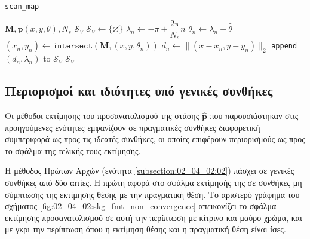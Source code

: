 \begin{algorithm}[!h]
  \caption{\texttt{scan\_map}}
  \label{alg:scan_map}
  \begin{spacing}{1.3}
    \begin{algorithmic}[1]
      \REQUIRE $\bm{M}, \bm{p}(x, y, \theta), N_s$
      \ENSURE $\mathcal{S}_V$
      \STATE $\mathcal{S}_V \leftarrow \{\varnothing\}$
      \STATE $\lambda_n \leftarrow -\pi + \dfrac{2\pi}{N_s} n$
      \STATE $\theta_n \leftarrow \lambda_n + \hat{\theta}$
      \STATE $(x_n,y_n) \leftarrow \texttt{intersect}(\bm{M}, (x,y, \theta_n))$
      \STATE $d_n \leftarrow \|(x- x_n, y-y_n)\|_2$
      \STATE \texttt{append} $(d_n, \lambda_n)$ to $\mathcal{S}_V$
      \ENDFOR
      \RETURN $\mathcal{S}_V$
    \end{algorithmic}
  \end{spacing}
\end{algorithm}


\subsection{Περιορισμοί και ιδιότητες υπό γενικές συνθήκες}
\label{subsection:02_04_02:07}

Οι μέθοδοι εκτίμησης του προσανατολισμού της στάσης $\hat{\bm{p}}$ που
παρουσιάστηκαν στις προηγούμενες ενότητες εμφανίζουν σε πραγματικές συνθήκες
διαφορετική συμπεριφορά ως προς τις ιδεατές συνθήκες, οι οποίες επιφέρουν
περιορισμούς ως προς το σφάλμα της τελικής τους εκτίμησης.

Η μέθοδος Πρώτων Αρχών (ενότητα \ref{subsection:02_04_02:02}) πάσχει σε γενικές
συνθήκες από δύο αιτίες. Η πρώτη αφορά στο σφάλμα εκτίμησής της σε συνθήκες μη
σύμπτωσης της εκτίμησης θέσης με την πραγματική θέση. Το αριστερό γράφημα του
σχήματος \ref{fig:02_04_02:skg_fmt_non_convergence} απεικονίζει το σφάλμα
εκτίμησης προσανατολισμού σε αυτή την περίπτωση με κίτρινο και μαύρο χρώμα, και
με γκρι την περίπτωση όπου η εκτίμηση θέσης και η πραγματική θέση είναι ίσες.

